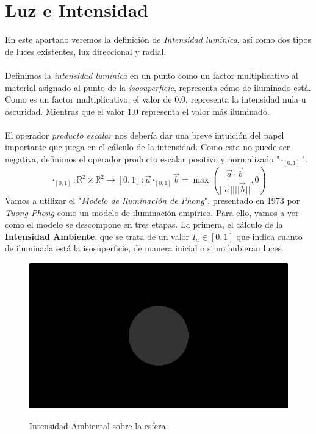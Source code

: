 \section{Luz e Intensidad}
En este apartado veremos la definición de \textit{Intensidad lumínica}, así como dos tipos de luces existentes, luz direccional y radial.\\\\
 Definimos la \textit{intensidad lumínica} en un punto como un factor multiplicativo al material asignado al punto de la \textit{isosuperficie}, representa cómo de iluminado está. Como es un factor multiplicativo, el valor de \(0.0\), representa la intensidad nula u oscuridad. Mientras que el valor \(1.0\) representa el valor más iluminado.\\\\ 
El operador \textit{producto escalar} nos debería dar una breve intuición del papel importante que juega en el cálculo de la intensidad. Como esta no puede ser negativa, definimos el operador producto escalar positivo y normalizado "\(\cdot_{[0,1]}\)".
\[\cdot_{[0,1]}:\mathbb{R}^2\times\mathbb{R}^2\longrightarrow[0,1] : \Vec{a}\cdot_{[0,1]}\Vec{b}=\max\left(\dfrac{\Vec{a}\cdot \Vec{b}}{\vert\vert\Vec{a}\vert\vert\vert\vert \Vec{b}\vert\vert}, 0\right)\]
Vamos a utilizar el "\textit{Modelo de Iluminación de Phong}", presentado en 1973 por \textit{Tuong Phong} como un modelo de iluminación empírico. Para ello, vamos a ver como el modelo se descompone en tres etapas. La primera, el cálculo de la \textbf{Intensidad Ambiente}, que se trata de un valor \(I_a \in [0,1]\) que indica cuanto de iluminada está la isosuperficie, de manera inicial o si no hubieran luces. 
\begin{figure}[H]
  \centering
  \captionsetup{justification=centering}%
  \includegraphics[width=1.0\textwidth]{secciones/imagenes/lightmodel/ambiental.png}\label{fig:ambient}
  \caption{Intensidad Ambiental sobre la esfera.}
\end{figure}
